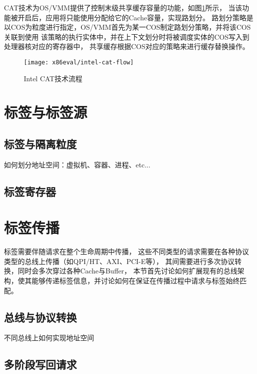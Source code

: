 CAT技术为OS/VMM提供了控制末级共享缓存容量的功能，如图\ref{fig:intel-cat-flow}所示，
当该功能被开启后，应用将只能使用分配给它的Cache容量，实现路划分。
路划分策略是以COS为粒度进行指定，OS/VMM首先为某一COS制定路划分策略，并将该COS关联到使用
该策略的执行实体中，并在上下文划分时将被调度实体的COS写入到处理器核对应的寄存器中，
共享缓存根据COS对应的策略来进行缓存替换操作。

\begin{figure}[H]
  \centering
  \texttt{[image: x86eval/intel-cat-flow]}
  \caption[Intel Cache Allocation Technology (CAT) 技术流程]{Intel CAT技术流程}
  \label{fig:intel-cat-flow}
\end{figure}


\section{标签与标签源}


\subsection{标签与隔离粒度}

如何划分地址空间：虚拟机、容器、进程、etc...

\subsection{标签寄存器}


\section{标签传播}

标签需要伴随请求在整个生命周期中传播，
这些不同类型的请求需要在各种协议类型的总线上传播（如QPI/HT、AXI、PCI-E等），
其间需要进行多次协议转换，同时会多次穿过各种Cache与Buffer，
本节首先讨论如何扩展现有的总线架构，使其能够传递标签信息，并讨论如何在保证在传播过程中请求与标签始终匹配。

\subsection{总线与协议转换}

不同总线上如何实现地址空间

\subsection{多阶段写回请求}

